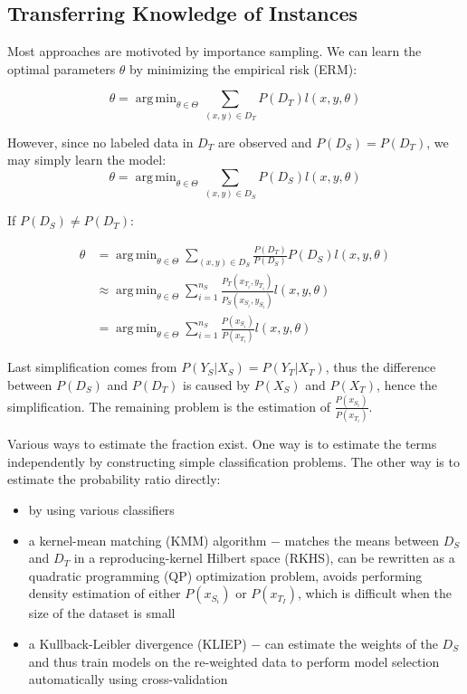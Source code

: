 \documentclass[a4paper,twocolumn]{article}
\DeclareMathOperator*{\argmin}{arg\,min}
\begin{document}
\subsection{Transferring Knowledge of Instances}
Most approaches are motivoted by importance sampling. We can learn the optimal parameters $\theta$ by minimizing the empirical risk (ERM):

\[
    \theta = \argmin_{\theta \in \Theta} \sum_{(x,y) \in D_T} P(D_T)l(x, y, \theta)
\]

However, since no labeled data in $D_T$ are observed and $P(D_S) = P(D_T)$, we may simply learn the model:
\[
    \theta = \argmin_{\theta \in \Theta} \sum_{(x,y) \in D_S} P(D_S)l(x, y, \theta)
\]

If $P(D_S) \ne P(D_T)$:

\begin{align*}
    \theta &= \argmin_{\theta \in \Theta} \sum_{(x,y) \in D_S} \frac{P(D_T)}{P(D_S)}P(D_S)l(x, y, \theta) \\
           &\approx \argmin_{\theta \in \Theta} \sum_{i = 1}^{n_S} \frac{P_T(x_{T_i}, y_{T_i})}{P_S(x_{S_i}, y_{S_i})}l(x, y, \theta) \\
           &= \argmin_{\theta \in \Theta} \sum_{i = 1}^{n_S} \frac{P(x_{S_i})}{P(x_{T_i})}l(x, y, \theta)
\end{align*}

Last simplification comes from $P(Y_S|X_S) = P(Y_T|X_T)$, thus the difference between $P(D_S)$ and $P(D_T)$ is caused by $P(X_S)$ and $P(X_T)$, hence the simplification. The remaining problem is the estimation of $\frac{P(x_{S_i})}{P(x_{T_i})}$.

Various ways to estimate the fraction exist. One way is to estimate the terms independently by constructing simple classification problems. The other way is to estimate the probability ratio directly:
\begin{itemize}
    \item by using various classifiers
    \item a kernel-mean matching (KMM) algorithm $-$ matches the means between $D_S$ and $D_T$ in a reproducing-kernel Hilbert space (RKHS), can be rewritten as a quadratic programming (QP) optimization problem, avoids performing density estimation of either $P(x_{S_i})$ or $P(x_{T_I})$, which is difficult when the size of the dataset is small
    \item a Kullback-Leibler divergence (KLIEP) $-$ can estimate the weights of the $D_S$ and thus train models on the re-weighted data to perform model selection automatically using cross-validation
\end{itemize}
\end{document}
